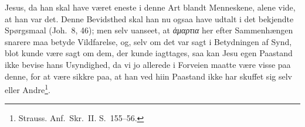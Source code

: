 \documentclass[12pt]{book}
\begin{document}
Jesus, da han skal have været eneste i denne Art blandt Menneskene,
alene vide, at han var det. Denne Bevidsthed skal han nu ogsaa have
udtalt i det bekjendte Spørgsmaal (Joh.\ 8, 46); men selv uanseet,
at \textit{ἁμαρτια} her efter Sammenhængen snarere maa betyde
Vildfarelse, og, selv om det var sagt i Betydningen af Synd, blot
kunde være sagt om dem, der kunde iagttages, saa kan Jesu
egen Paastand ikke bevise hans Usyndighed, da vi jo allerede i
Forveien maatte være visse paa denne, for at være sikkre paa, at han
ved hiin Paastand ikke har skuffet sig selv eller
Andre\footnote{Strauss. Anf.\ Skr.\ II. S.\ 155--56.}.
\end{document}
